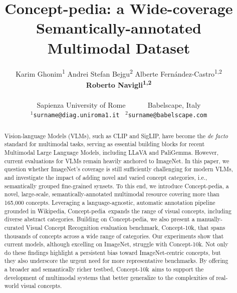 \documentclass[11pt]{article}
\title{Concept-pedia: a Wide-coverage Semantically-annotated \\ Multimodal Dataset}
\author{  Karim Ghonim\textsuperscript{1} \quad \quad Andrei Stefan Bejgu\textsuperscript{2} \quad \quad Alberte Fernández-Castro\textsuperscript{1,2} \\ 
 \hspace{-2cm} {\bf Roberto Navigli\textsuperscript{1,2}} \\\\
 Sapienza University of Rome  \qquad  \qquad  \qquad  \qquad  ~~~~~
        Babelscape, Italy  \qquad \qquad   \\
   $^1$\texttt{surname@diag.uniroma1.it} \qquad \quad  \qquad  \qquad
   ~$^2$\texttt{surname@babelscape.com}
        }
\newcommand{\resource}{Concept-pedia}
\newcommand{\benchmark}{Concept-10k}
\begin{document}
\maketitle
\begin{abstract}
Vision-language Models (VLMs), such as CLIP and SigLIP, have become the \textit{de facto} standard for multimodal tasks, serving as essential building blocks for recent Multimodal Large Language Models, including LLaVA and PaliGemma. 
However, current evaluations for VLMs remain heavily anchored to ImageNet.
In this paper, we question whether ImageNet's coverage is still sufficiently challenging for modern VLMs, and investigate the impact of adding novel and varied concept categories, i.e., semantically grouped fine-grained synsets. 
To this end, we introduce \resource, a novel, large-scale, semantically-annotated multimodal resource covering more than 165,000 concepts.
Leveraging a language-agnostic, automatic annotation pipeline grounded in Wikipedia, \resource~expands the range of visual concepts, including diverse abstract categories.
Building on \resource, we also present a manually-curated Visual Concept Recognition evaluation benchmark, \benchmark, that spans thousands of concepts across a wide range of categories.
Our experiments show that current models, although excelling on ImageNet, struggle with \benchmark. Not only do these findings highlight a persistent bias toward ImageNet-centric concepts, but they also underscore the urgent need for more representative benchmarks. 
By offering a broader and semantically richer testbed, \benchmark~aims to support the development of multimodal systems that better generalize to the complexities of real-world visual concepts.
\end{abstract}
\end{document}

